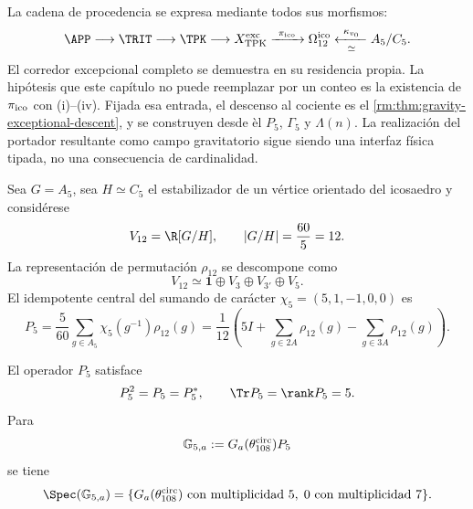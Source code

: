 La cadena de procedencia se expresa mediante todos sus morfismos:
\begin{equation}
\label{rm:eq:gravity-exceptional-provenance}
\APP\longrightarrow\TRIT\longrightarrow\TPK
\longrightarrow X_{\rm TPK}^{\rm exc}
\xrightarrow{\ \pi_{\rm ico}\ }\Omega_{12}^{\rm ico}
\xleftarrow[\simeq]{\ \kappa_{v_0}\ }A_5/C_5.
\end{equation}
El corredor excepcional completo se demuestra en su residencia propia. La
hip\'otesis que este cap\'itulo no puede reemplazar por un conteo es la
existencia de \(\pi_{\rm ico}\) con (i)--(iv). Fijada esa entrada, el descenso
al cociente es el \cref{rm:thm:gravity-exceptional-descent}, y se construyen
desde \`el \(P_5\), \(\Gamma_5\) y \(\Lambda(n)\). La realizaci\'on del
portador resultante como campo gravitatorio sigue siendo una interfaz
f\'isica tipada, no una consecuencia de cardinalidad.

Sea \(G=A_5\), sea \(H\simeq C_5\) el estabilizador de un v\'ertice
orientado del icosaedro y consid\'erese
\begin{equation}
\label{rm:eq:gravity-v12}
V_{12}=\R[G/H],
\qquad |G/H|=\frac{60}{5}=12.
\end{equation}
La representaci\'on de permutaci\'on \(\rho_{12}\) se descompone como
\begin{equation}
\label{rm:eq:gravity-v12-decomposition}
V_{12}\simeq\mathbf1\oplus V_3\oplus V_{3'}\oplus V_5.
\end{equation}
El idempotente central del sumando de car\'acter
\(\chi_5=(5,1,-1,0,0)\) es
\begin{equation}
\label{rm:eq:gravity-p5}
\boxed{
P_5=\frac5{60}\sum_{g\in A_5}\chi_5(g^{-1})\rho_{12}(g)
=\frac1{12}\left(
5I+\sum_{g\in2A}\rho_{12}(g)
-\sum_{g\in3A}\rho_{12}(g)
\right).}
\end{equation}

\begin{theorem}
\label{rm:thm:gravity-p5-coupling}
El operador \(P_5\) satisface
\begin{equation}
\label{rm:eq:gravity-p5-properties}
P_5^2=P_5=P_5^*,
\qquad \Tr P_5=\rank P_5=5.
\end{equation}
Para
\begin{equation}
\label{rm:eq:gravity-G5}
\mathbb G_{5,a}:=G_a(\theta_{108}^{\rm circ})P_5
\end{equation}
se tiene
\begin{equation}
\label{rm:eq:gravity-G5-spectrum}
\Spec(\mathbb G_{5,a})
=\{G_a(\theta_{108}^{\rm circ})\text{ con multiplicidad }5,
\;0\text{ con multiplicidad }7\}.
\end{equation}
\end{theorem}

